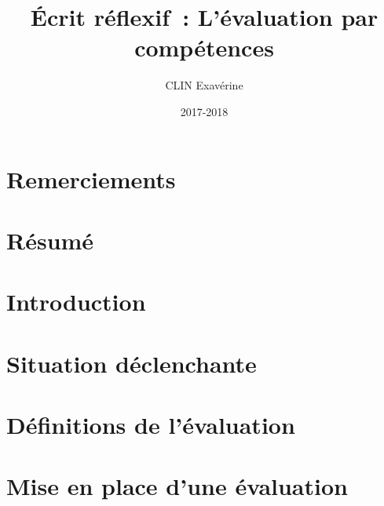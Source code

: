 \documentclass[a4paper, 12pt, french]{article}
\title{Écrit réflexif~: L'évaluation par compétences}
\author{CLIN Exavérine}
\date{2017-2018}
\begin{document}


\thispagestyle{empty}

\newpage
\part*{Remerciements}

\thispagestyle{empty}

\newpage
\part*{Résumé}



\newpage
\tableofcontents

\newpage
\part{Introduction}


\newpage
\part{Situation déclenchante}

\setcounter{section}{0}

\newpage
\part{Définitions de l'évaluation}

\setcounter{section}{0}

\newpage
\part{Mise en place d'une évaluation}

\setcounter{section}{0}

%
\end{document}
